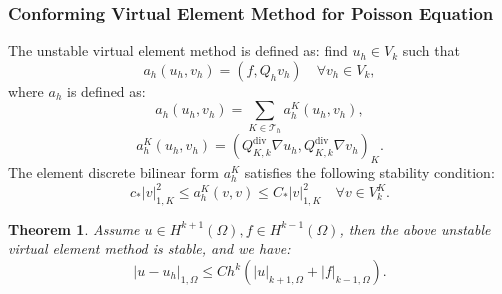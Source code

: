 \documentclass[notheorems,serif]{beamer}
\newtheorem{theorem}{\textbf{Theorem}}
\begin{document}
\begin{CJK}{UTF8}{gkai}
\begin{frame}
    \frametitle{Conforming Virtual Element Method for Poisson Equation}
The unstable virtual element method is defined as: find $u_h \in V_k$ such that
$$
a_h(u_h, v_h) = (f, Q_h v_h) \quad \forall v_h \in V_k,
$$
where $a_h$ is defined as:
$$
a_h(u_h, v_h) = \sum_{K \in \mathcal{T}_h} a_h^K(u_h, v_h),
$$
$$
a_h^K(u_h, v_h) = (Q_{K, k}^{\mathrm{div}}\nabla u_h, Q_{K,
k}^{\mathrm{div}}\nabla v_h)_K.
$$
The element discrete bilinear form $a_h^K$ satisfies the following stability condition:
$$
c_* |v|_{1, K}^2 \leq a_h^K(v, v) \leq C_* |v|_{1, K}^2 \quad \forall v \in
V_k^K.
$$
\begin{theorem}
Assume $u \in H^{k+1}(\Omega), f \in H^{k-1}(\Omega)$, then the above unstable virtual element method
is stable, and we have:
$$
|u - u_h|_{1, \Omega} \leq C h^{k}
(|u|_{k+1, \Omega} + |f|_{k-1, \Omega}).
$$
\end{theorem}
\end{frame}


\end{CJK}
\end{document}
